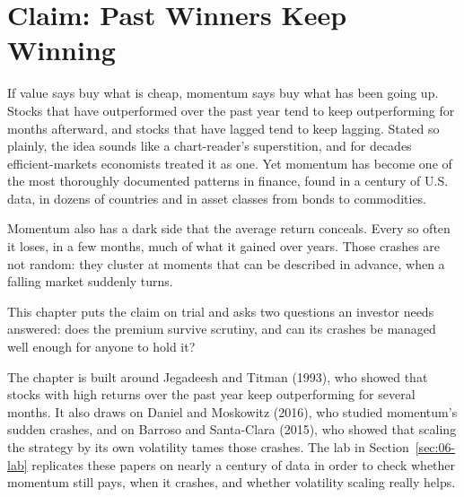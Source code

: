 \makeatletter
{}
\makeatother

\chapter{Claim: Past Winners Keep Winning}
\label{ch:06}

If value says buy what is cheap, momentum says buy what has been going up. Stocks that have outperformed over the past year tend to keep outperforming for months afterward, and stocks that have lagged tend to keep lagging. Stated so plainly, the idea sounds like a chart-reader's superstition, and for decades efficient-markets economists treated it as one. Yet momentum has become one of the most thoroughly documented patterns in finance, found in a century of U.S. data, in dozens of countries and in asset classes from bonds to commodities.

Momentum also has a dark side that the average return conceals. Every so often it loses, in a few months, much of what it gained over years. Those crashes are not random: they cluster at moments that can be described in advance, when a falling market suddenly turns.

This chapter puts the claim on trial and asks two questions an investor needs answered: does the premium survive scrutiny, and can its crashes be managed well enough for anyone to hold it?

The chapter is built around Jegadeesh and Titman (1993), who showed that stocks with high returns over the past year keep outperforming for several months. It also draws on Daniel and Moskowitz (2016), who studied momentum's sudden crashes, and on Barroso and Santa-Clara (2015), who showed that scaling the strategy by its own volatility tames those crashes. The lab in Section~\ref{sec:06-lab} replicates these papers on nearly a century of data in order to check whether momentum still pays, when it crashes, and whether volatility scaling really helps.

